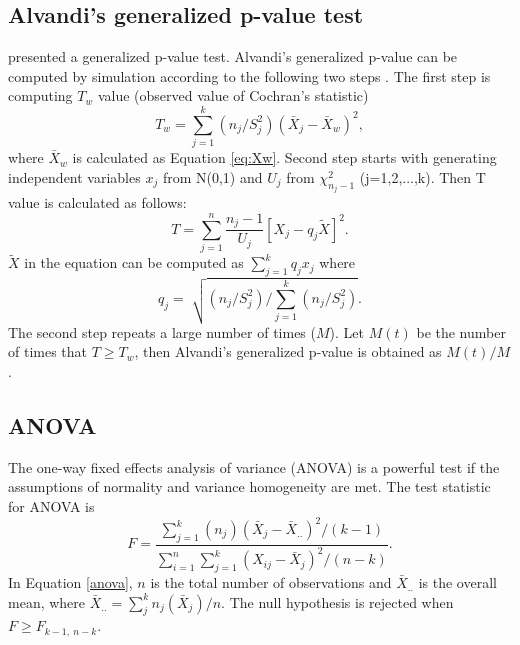 \subsection{Alvandi's generalized p-value test}
\citet{sadooghi2012} presented a generalized p-value test.
Alvandi's generalized p-value can be computed by simulation according to the following two steps \citep{cavus2021testing}.
The first step is computing $T_w$ value (observed value of Cochran's statistic)
\begin{equation}
T_w=\displaystyle\sum\limits_{j=1}^k (n_j/S_j^2)(\bar{X}_{j}-\bar{X}_{w})^2,
\end{equation}
where \begin{math}\bar{X}_{w}\end{math} is calculated as Equation \ref{eq:Xw}.
Second step starts with generating independent variables $x_j$ from N(0,1) and $U_j$  from $\chi^2_{n_j-1}$ (j=1,2,...,k). Then T value is calculated as follows: 
\begin{equation}
T=\displaystyle\sum\limits_{j=1}^n \frac{n_j-1}{U_j}[X_j-q_j\tilde{X}]^2.
\end{equation}
$\tilde{X}$ in the equation can be computed as \begin{math} \displaystyle\sum\limits_{j=1}^k q_jx_j \end{math} where \begin{equation}
q_j=\sqrt[]{{(n_j/S_j^2)}/{\displaystyle\sum\limits_{j=1}^k (n_j/S_j^2)}}.
\end{equation}
The second step repeats a large number of times (${M}$). Let ${M(t)}$ be the number of times that \begin{math} T \geqslant {T_w} \end{math}, then Alvandi's generalized p-value is obtained as ${M(t)}/{M}$.



\subsection{ANOVA} 
The one-way fixed effects analysis of variance (ANOVA) is a powerful test if the assumptions of normality and variance homogeneity are met. The test statistic for ANOVA is 
\begin{equation}\label{anova}
F=\frac{\sum\limits_{j=1}^k(n_j)(\bar{X}_{j}-\bar{X}_{..})^2/(k-1)}{\sum\limits_{i=1}^n\sum\limits_{j=1}^k(X_{ij}-\bar{X}_{j})^2/(n-k)}.
\end{equation}
In Equation \ref{anova}, $n$ is the total number of observations and $\bar{X}_{..}$ is the overall mean, where $\bar{X}_{..}=\displaystyle\sum_{j}^{k} n_j(\bar{X}_{j})/n$. The null hypothesis is rejected when \begin{math} F \geqslant F_{k-1, \ n-k} \end{math}.

